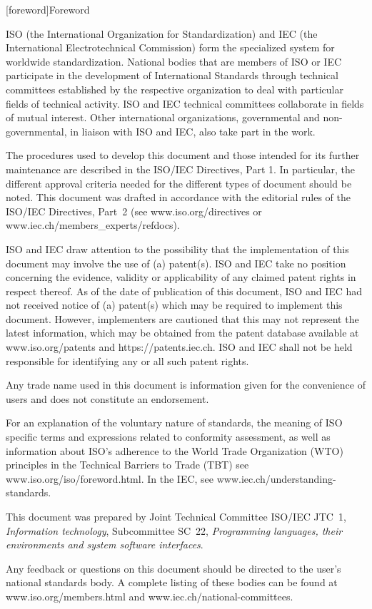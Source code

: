 
[foreword]{Foreword}

ISO (the International Organization for Standardization) and IEC (the International Electrotechnical Commission) form the specialized system for worldwide standardization. National bodies that are members of ISO or IEC participate in the development of International Standards through technical committees established by the respective organization to deal with particular fields of technical activity. ISO and IEC technical committees collaborate in fields of mutual interest. Other international organizations, governmental and non-governmental, in liaison with ISO and IEC, also take part in the work.

The procedures used to develop this document and those intended for its further maintenance are described in the ISO/IEC Directives, Part 1. In particular, the different approval criteria needed for the different types of document should be noted. This document was drafted in accordance with the editorial rules of the ISO/IEC Directives, Part 2 (see www.iso.org/directives or www.iec.ch/members_experts/refdocs).

ISO and IEC draw attention to the possibility that the implementation of this document may involve the use of (a) patent(s). ISO and IEC take no position concerning the evidence, validity or applicability of any claimed patent rights in respect thereof. As of the date of publication of this document, ISO and IEC had not received notice of (a) patent(s) which may be required to implement this document. However, implementers are cautioned that this may not represent the latest information, which may be obtained from the patent database available at www.iso.org/patents and https://patents.iec.ch. ISO and IEC shall not be held responsible for identifying any or all such patent rights.

Any trade name used in this document is information given for the convenience of users and does not constitute an endorsement.

For an explanation of the voluntary nature of standards, the meaning of ISO specific terms and expressions related to conformity assessment, as well as information about ISO's adherence to the World Trade Organization (WTO) principles in the Technical Barriers to Trade (TBT) see www.iso.org/iso/foreword.html. In the IEC, see www.iec.ch/understanding-standards.

This document was prepared by Joint Technical Committee ISO/IEC JTC 1, \emph{Information technology}, Subcommittee SC 22, \emph{Programming languages, their environments and system software interfaces}.

Any feedback or questions on this document should be directed to the user’s national standards body. A complete listing of these bodies can be found at www.iso.org/members.html and www.iec.ch/national-committees.
